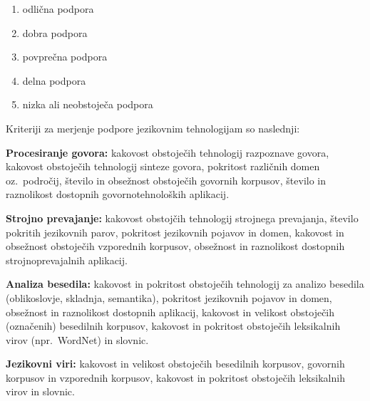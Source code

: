 \begin{multicols}{2}
\begin{enumerate}
\item odlična podpora
\item dobra podpora
\item povprečna podpora
\item delna podpora
\item nizka ali neobstoječa podpora
\end{enumerate}

Kriteriji za merjenje podpore jezikovnim tehnologijam so naslednji:

\textbf{Procesiranje govora:} kakovost obstoječih tehnologij razpoznave govora, kakovost obstoječih tehnologij sinteze go\-vora, pokritost različnih domen oz.~področij, število in obsežnost obstoječih go\-vornih korpusov, število in raznolikost dostopnih go\-vornotehnoloških aplikacij.

\textbf{Strojno prevajanje:} kakovost obstojčih tehnologij stroj\-nega prevajanja, število pokritih jezikovnih parov, pokritost jezikovnih pojavov in domen, kakovost in obsežnost obstoječih vzporednih korpusov, obsežnost in raznolikost dostopnih stroj\-noprevajalnih aplikacij.

\textbf{Analiza besedila:} kakovost in pokritost obstoječih tehnologij za analizo besedila (oblikoslovje, skladnja, semantika), pokritost jezikovnih pojavov in domen, obsežnost in raznolikost dostopnih aplikacij, kakovost in velikost obstoječih (označenih) besedilnih korpusov, kakovost in pokritost obstoječih leksikalnih virov (npr.~WordNet) in slovnic.

\textbf{Jezikovni viri:} kakovost in velikost obstoječih besedilnih korpusov, go\-vornih korpusov in vzporednih korpusov, kakovost in pokritost obstoječih leksikalnih virov in slovnic.


\end{multicols}

